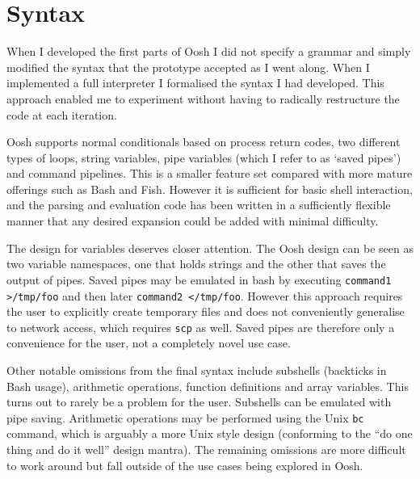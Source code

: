\documentclass[12pt,twoside,notitlepage]{report}
\begin{document}
\section{Syntax}
When I developed the first parts of Oosh I did not specify a grammar and simply
modified the syntax that the prototype accepted as I went along. When I
implemented a full interpreter I formalised the syntax I had developed. This
approach enabled me to experiment without having to radically restructure the
code at each iteration.

Oosh supports normal conditionals based on process return codes, two
different types of loops, string variables, pipe variables (which I
refer to as `saved pipes') and command pipelines. This is a smaller
feature set compared with more mature offerings such as Bash and
Fish. However it is sufficient for basic shell interaction, and the
parsing and evaluation code has been written in a sufficiently
flexible manner that any desired expansion could be added with minimal
difficulty.

The design for variables deserves closer attention. The Oosh design
can be seen as two variable namespaces, one that holds strings and the
other that saves the output of pipes. Saved pipes may be emulated in
bash by executing {\tt command1 >/tmp/foo} and then later {\tt command2
  </tmp/foo}. However this approach requires the user to explicitly
create temporary files and does not conveniently generalise to network
access, which requires {\tt scp} as well. Saved pipes are therefore
only a convenience for the user, not a completely novel use case.

Other notable omissions from the final syntax include subshells
(backticks in Bash usage), arithmetic operations, function definitions
and array variables. This turns out to rarely be a problem for the
user. Subshells can be emulated with pipe saving. Arithmetic
operations may be performed using the Unix {\tt bc} command, which is
arguably a more Unix style design (conforming to the ``do one thing
and do it well'' design mantra). The remaining omissions are more
difficult to work around but fall outside of the use cases being
explored in Oosh.
\end{document}
